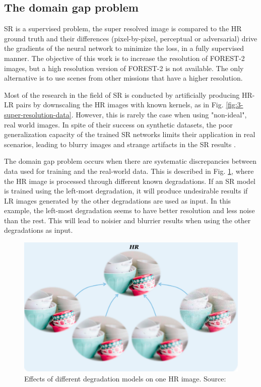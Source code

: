     \subsection{The domain gap problem} \label{subsec:domaingap}
 
        SR is a supervised problem, the super resolved image is compared to the HR ground truth and their differences (pixel-by-pixel, perceptual or adversarial) drive the gradients of the neural network to minimize the loss, in a fully supervised manner. 
        The objective of this work is to increase the resolution of FOREST-2 images, but a high resolution version of FOREST-2 is not available. 
        The only alternative is to use scenes from other missions that have a higher resolution.

        Most of the research in the field of SR is conducted by artificially producing HR-LR pairs by downscaling the HR images with known kernels, as in Fig. \ref{fig:3-super-resolution-data}.
        However, this is rarely the case when using "non-ideal", real world images.
        In spite of their success on synthetic datasets, the poor generalization capacity of the trained SR networks limits their application in real scenarios, leading to blurry images and strange artifacts in the SR results \cite{lugmayr2020ntire}.

        The domain gap problem occurs when there are systematic discrepancies between data used for training and the real-world data. 
        This is described in Fig. \ref{fig:2-domain-gap}, where the HR image is processed through different known degradations. 
        If an SR model is trained using the left-most degradation, it will produce undesirable results if LR images generated by the other degradations are used as input.
        In this example, the left-most degradation seems to have better resolution and less noise than the rest. This will lead to noisier and blurrier results when using the other degradations as input.

        \begin{figure}[H]
            \centering
            \includegraphics[scale=0.4]{Includes/2-domain-gap.pdf}
            \caption{Effects of different degradation models on one HR image. Source: \cite{liu2021blind}}
            \label{fig:2-domain-gap}
        \end{figure}

